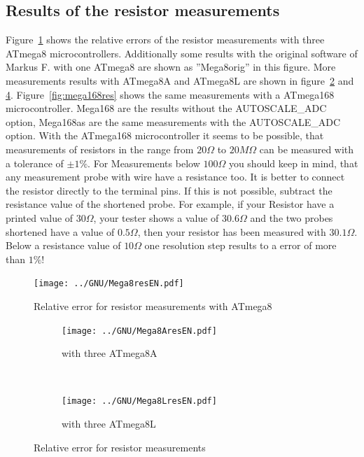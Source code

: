 \subsection{Results of the resistor measurements}
Figure~\ref{fig:mega8res} shows the relative errors of the resistor measurements with three
ATmega8 microcontrollers. Additionally some results with the original software of Markus F.
with one ATmega8 are shown as ''Mega8orig'' in this figure.
More measurements results with ATmega8A and ATmega8L are shown in  figure~\ref{fig:mega8Ares} 
and \ref{fig:mega8Lres}.
Figure~\ref{fig:mega168res} shows the same measurements with a ATmega168 microcontroller.
Mega168 are the results without the AUTOSCALE\_ADC option, Mega168as are the same
measurements with the AUTOSCALE\_ADC option.
With the ATmega168 microcontroller it seems to be possible, that measurements of resistors
in the range from \(20\Omega\) to \(20M\Omega\) can be measured with a tolerance of \(\pm1\%\).
For Measurements below \(100\Omega\) you should keep in mind, that any measurement probe with
wire have a resistance too. It is better to connect the resistor directly to the terminal pins.
If this is not possible, subtract the resistance value of the shortened probe.
For example, if your Resistor have a printed value of \(30\Omega\), your tester shows a value of \(30.6\Omega\)
and the two probes shortened have a value of \(0.5\Omega\), then your resistor has been measured
with \(30.1\Omega\).
Below a resistance value of \(10\Omega\) one resolution step results to a error of more than \(1\%\)!

\begin{figure}[H]
\centering
\texttt{[image: ../GNU/Mega8resEN.pdf]}
\caption{Relative error for resistor measurements with ATmega8 }
\label{fig:mega8res}
\end{figure}

\begin{figure}[H]
  \begin{subfigure}[b]{.5\textwidth}
    \centering
    \texttt{[image: ../GNU/Mega8AresEN.pdf]}
    \caption{with three ATmega8A}
    \label{fig:mega8Ares}
  \end{subfigure}
  ~
  \begin{subfigure}[b]{.5\textwidth}
    \centering
    \texttt{[image: ../GNU/Mega8LresEN.pdf]}
    \caption{with three ATmega8L}
    \label{fig:mega8Lres}
  \end{subfigure}
\caption{Relative error for resistor measurements}
\end{figure}


